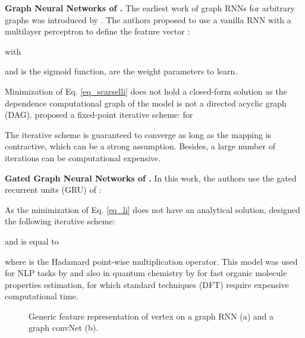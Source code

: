 \documentclass{article} \usepackage{iclr2018_conference,times}
\begin{document}
{\bf Graph Neural Networks of \cite{art:ScarselliGoriTsoiHagenbuchnerMonfardini09}.} The earliest work of graph RNNs for arbitrary graphs was introduced by \cite{art:GoriMonfardiniScarselli05GNN,art:ScarselliGoriTsoiHagenbuchnerMonfardini09}. The authors proposed to use a vanilla RNN with a multilayer perceptron to define the feature vector :

with

and  is the sigmoid function,  are the weight parameters to learn. 




Minimization of Eq. \eqref{eq_scarselli} does not hold a closed-form solution as the dependence computational graph of the model is not a directed acyclic graph (DAG). \cite{art:ScarselliGoriTsoiHagenbuchnerMonfardini09} proposed a fixed-point iterative scheme:  for 

The iterative scheme is guaranteed to converge as long as the mapping is contractive, which can be a strong assumption. Besides, a large number of iterations can be computational expensive. 







{\bf Gated Graph Neural Networks of \cite{art:LiTarlowBrockschmidtZemel16GNN}.} In this work, the authors use the gated recurrent units (GRU) of \cite{art:ChungGulcehreChoBengio14GRU}:

As the minimization of Eq. \eqref{eq_li} does not have an analytical solution,  \cite{art:LiTarlowBrockschmidtZemel16GNN} designed the following iterative scheme: 

and  is equal to

where  is the Hadamard point-wise multiplication operator. This model was used for NLP tasks by \cite{art:LiTarlowBrockschmidtZemel16GNN} and also in quantum chemistry by \cite{art:GilmerSchoenholzRileyVinyalsDahl17Molecule} for fast organic molecule properties estimation, for which standard techniques (DFT) require expensive computational time.

 

\begin{figure}[t]
\centering
{}
\hspace{1.5cm}
\caption{Generic feature representation  of vertex  on a graph RNN (a) and a graph convNet (b).}
\label{fig0}
\end{figure}
\end{document}
